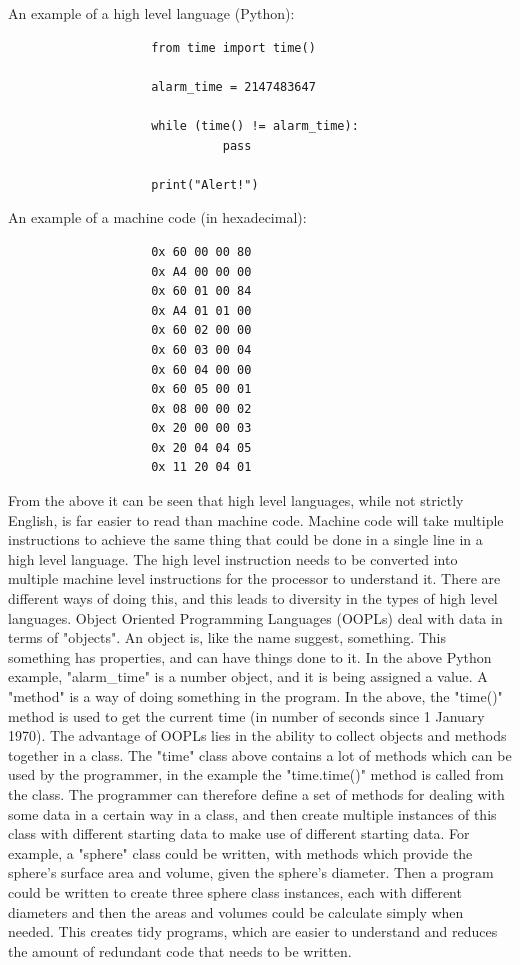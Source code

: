 \documentclass{report}
\begin{document}
An example of a high level language (Python):
\begin{verbatim}
                    from time import time()

                    alarm_time = 2147483647

                    while (time() != alarm_time):
                              pass

                    print("Alert!")
\end{verbatim}
An example of a machine code (in hexadecimal)\cite{proglangmachex}:
\begin{verbatim}
                    0x 60 00 00 80
                    0x A4 00 00 00
                    0x 60 01 00 84
                    0x A4 01 01 00
                    0x 60 02 00 00
                    0x 60 03 00 04
                    0x 60 04 00 00
                    0x 60 05 00 01
                    0x 08 00 00 02
                    0x 20 00 00 03
                    0x 20 04 04 05
                    0x 11 20 04 01
\end{verbatim}
	From the above it can be seen that high level languages, while not strictly English, is far easier to read than machine code. Machine code will take multiple instructions to achieve the same thing that could be done in a single line in a high level language. The high level instruction needs to be converted into multiple machine level instructions for the processor to understand it. There are different ways of doing this, and this leads to diversity in the types of high level languages. Object Oriented Programming Languages (OOPLs) deal with data in terms of "objects"\cite{proglangwhatisoopl}. An object is, like the name suggest, something. This something has properties, and can have things done to it. In the above Python example, "alarm\_time" is a number object, and it is being assigned a value. A "method" is a way of doing something in the program. In the above, the "time()" method is used to get the current time (in number of seconds since 1 January 1970). The advantage of OOPLs lies in the ability to collect objects and methods together in a class. The "time" class above contains a lot of methods which can be used by the programmer, in the example the "time.time()" method is called from the class. The programmer can therefore define a set of methods for dealing with some data in a certain way in a class, and then create multiple instances of this class with different starting data to make use of different starting data. For example, a "sphere" class could be written, with methods which provide the sphere's surface area and volume, given the sphere's diameter. Then a program could be written to create three sphere class instances, each with different diameters and then the areas and volumes could be calculate simply when needed. This creates tidy programs, which are easier to understand and reduces the amount of redundant code that needs to be written.\newline \newline  \noindent
\end{document}
